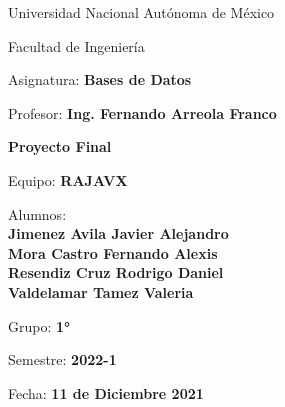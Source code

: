 \documentclass[letter,12pt]{article} %
\begin{document}
\begin{center} 
\Huge{Universidad Nacional Aut\'onoma de M\'exico
}
\par\vspace{1.5cm}
{
\Huge{  Facultad de Ingenier\'ia
}
}
\par\vspace{1cm}
{
\large{  Asignatura: \textbf{Bases de Datos}
}
}
\par\vspace{0.5cm}
{
\large{  Profesor:  \textbf{Ing. Fernando Arreola Franco}
}
}
\par\vspace{0.5cm}
{
\large{ \textbf{ Proyecto Final}
}
}
\par\vspace{0.5cm}
{
\large{ Equipo: \textbf{RAJAVX}
}
}
\par\vspace{0.5cm}
{
\large{ Alumnos: 
\\ \textbf{Jimenez Avila Javier Alejandro
\\Mora Castro Fernando Alexis
\\Resendiz Cruz Rodrigo Daniel
\\Valdelamar Tamez Valeria
}\\
}
}
\par\vspace{0.5cm}
{
\large{ Grupo:  \textbf{1°}
}
}
\par\vspace{0.5cm}
{
\large{ Semestre:  \textbf{2022-1}
}
}
\par\vspace{0.5cm}
{
\large{ Fecha:  \textbf{11 de Diciembre 2021}
}
}
		
\end{center}  

\vspace{0.4cm}

\end{document}
